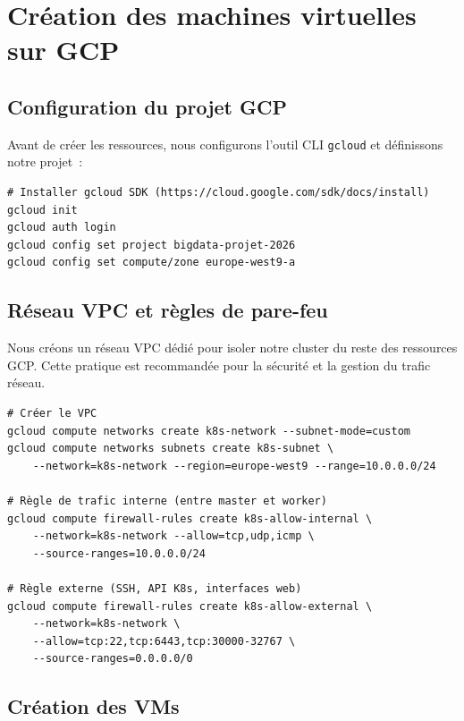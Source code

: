 \documentclass[12pt,a4paper,french]{report}
\newcommand{\cmd}[1]{\texttt{\small\color{keywordcolor}#1}}
\begin{document}
\section{Création des machines virtuelles sur GCP}

\subsection{Configuration du projet GCP}

Avant de créer les ressources, nous configurons l'outil CLI \cmd{gcloud} et définissons notre projet~:

\begin{lstlisting}[style=bash, caption={Initialisation de gcloud}]
# Installer gcloud SDK (https://cloud.google.com/sdk/docs/install)
gcloud init
gcloud auth login
gcloud config set project bigdata-projet-2026
gcloud config set compute/zone europe-west9-a
\end{lstlisting}

\subsection{Réseau VPC et règles de pare-feu}

Nous créons un réseau VPC dédié pour isoler notre cluster du reste des ressources GCP. Cette pratique est recommandée pour la sécurité et la gestion du trafic réseau.

\begin{lstlisting}[style=bash, caption={Création du VPC et des règles de firewall}]
# Créer le VPC
gcloud compute networks create k8s-network --subnet-mode=custom
gcloud compute networks subnets create k8s-subnet \
    --network=k8s-network --region=europe-west9 --range=10.0.0.0/24

# Règle de trafic interne (entre master et worker)
gcloud compute firewall-rules create k8s-allow-internal \
    --network=k8s-network --allow=tcp,udp,icmp \
    --source-ranges=10.0.0.0/24

# Règle externe (SSH, API K8s, interfaces web)
gcloud compute firewall-rules create k8s-allow-external \
    --network=k8s-network \
    --allow=tcp:22,tcp:6443,tcp:30000-32767 \
    --source-ranges=0.0.0.0/0
\end{lstlisting}

\subsection{Création des VMs}
\end{document}
